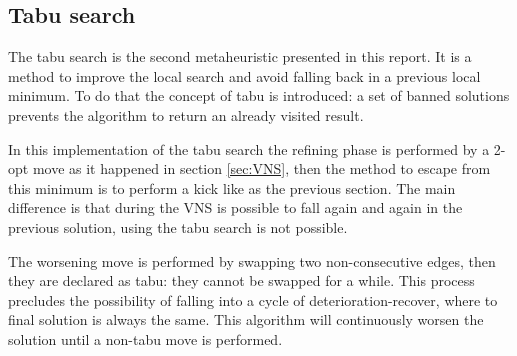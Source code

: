 \subsection{Tabu search}
\label{sec:tabu-search}
The tabu search is the second metaheuristic presented in this report. It is a method to improve the local search and avoid falling back in a previous local minimum. To do that the concept of tabu is introduced: a set of banned solutions prevents the algorithm to return an already visited result.

In this implementation of the tabu search the refining phase is performed by a 2-opt move as it happened in section \ref{sec:VNS}, then the method to escape from this minimum is to perform a kick like as the previous section. The main difference is that during the VNS is possible to fall again and again in the previous solution, using the tabu search is not possible. 

The worsening move is performed by swapping two non-consecutive edges, then they are declared as tabu: they cannot be swapped for a while. This process precludes the possibility of falling into a cycle of deterioration-recover, where to final solution is always the same. This algorithm will continuously worsen the solution until a non-tabu move is performed.